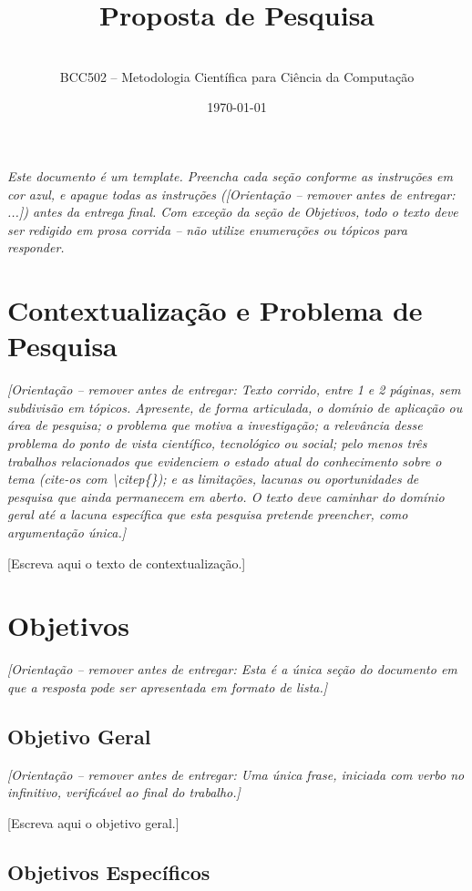 \documentclass[10pt,a4paper]{extarticle}
\title{Proposta de Pesquisa\\ \large \guia{substitua pelo título do seu trabalho}}
\author{\guia{Nome completo do(a) aluno(a)} \\ BCC502 -- Metodologia Científica para Ciência da Computação}
\date{\today}
\newcommand{\ntc}[1]{\textcolor{notice}{#1}}
\newcommand{\guia}[1]{{\small\ntc{\textit{[Orientação -- remover antes de entregar: #1]}}}}
\begin{document}
\maketitle

\begin{center}
\ntc{\textit{Este documento é um template. Preencha cada seção conforme as instruções em cor azul,
e apague todas as instruções (\guia{...}) antes da entrega final. Com exceção da seção de
Objetivos, todo o texto deve ser redigido em prosa corrida -- não utilize enumerações ou
tópicos para responder.}}
\end{center}

\section{Contextualização e Problema de Pesquisa}

\guia{Texto corrido, entre 1 e 2 páginas, sem subdivisão em tópicos. Apresente, de forma
articulada, o domínio de aplicação ou área de pesquisa; o problema que motiva a investigação;
a relevância desse problema do ponto de vista científico, tecnológico ou social; pelo menos
três trabalhos relacionados que evidenciem o estado atual do conhecimento sobre o tema
(cite-os com \textbackslash citep\{\}); e as limitações, lacunas ou oportunidades de pesquisa
que ainda permanecem em aberto. O texto deve caminhar do domínio geral até a lacuna
específica que esta pesquisa pretende preencher, como argumentação única.}

[Escreva aqui o texto de contextualização.]

\section{Objetivos}

\ntc{\guia{Esta é a única seção do documento em que a resposta pode ser apresentada em
formato de lista.}}

\subsection{Objetivo Geral}

\guia{Uma única frase, iniciada com verbo no infinitivo, verificável ao final do trabalho.}

[Escreva aqui o objetivo geral.]

\subsection{Objetivos Específicos}
\end{document}
